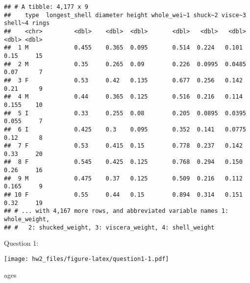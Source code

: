 \documentclass[
]{article}
\newenvironment{Shaded}{\begin{snugshade}}{\end{snugshade}}
\newcommand{\AttributeTok}[1]{\textcolor[rgb]{0.77,0.63,0.00}{#1}}
\newcommand{\FloatTok}[1]{\textcolor[rgb]{0.00,0.00,0.81}{#1}}
\newcommand{\FunctionTok}[1]{\textcolor[rgb]{0.00,0.00,0.00}{#1}}
\newcommand{\NormalTok}[1]{#1}
\newcommand{\OtherTok}[1]{\textcolor[rgb]{0.56,0.35,0.01}{#1}}
\newcommand{\SpecialCharTok}[1]{\textcolor[rgb]{0.00,0.00,0.00}{#1}}
\newcommand{\StringTok}[1]{\textcolor[rgb]{0.31,0.60,0.02}{#1}}
\begin{document}
\begin{verbatim}
## # A tibble: 4,177 x 9
##    type  longest_shell diameter height whole_wei~1 shuck~2 visce~3 shell~4 rings
##    <chr>         <dbl>    <dbl>  <dbl>       <dbl>   <dbl>   <dbl>   <dbl> <dbl>
##  1 M             0.455    0.365  0.095       0.514  0.224   0.101    0.15     15
##  2 M             0.35     0.265  0.09        0.226  0.0995  0.0485   0.07      7
##  3 F             0.53     0.42   0.135       0.677  0.256   0.142    0.21      9
##  4 M             0.44     0.365  0.125       0.516  0.216   0.114    0.155    10
##  5 I             0.33     0.255  0.08        0.205  0.0895  0.0395   0.055     7
##  6 I             0.425    0.3    0.095       0.352  0.141   0.0775   0.12      8
##  7 F             0.53     0.415  0.15        0.778  0.237   0.142    0.33     20
##  8 F             0.545    0.425  0.125       0.768  0.294   0.150    0.26     16
##  9 M             0.475    0.37   0.125       0.509  0.216   0.112    0.165     9
## 10 F             0.55     0.44   0.15        0.894  0.314   0.151    0.32     19
## # ... with 4,167 more rows, and abbreviated variable names 1: whole_weight,
## #   2: shucked_weight, 3: viscera_weight, 4: shell_weight
\end{verbatim}

Question 1:

\begin{Shaded}
\end{Shaded}

\texttt{[image: hw2\_files/figure-latex/question1-1.pdf]}

\begin{Shaded}
\begin{Highlighting}[]
\NormalTok{ages}
\end{Highlighting}
\end{Shaded}
\end{document}
